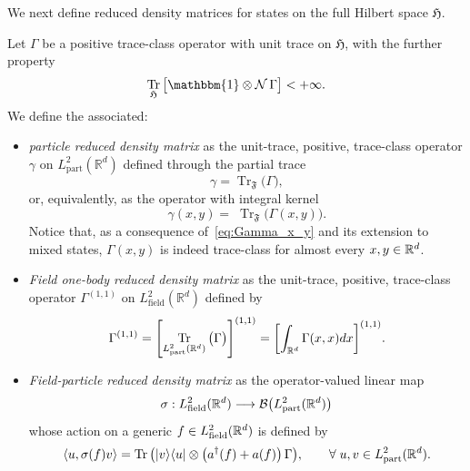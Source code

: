 \documentclass[AHL,Unicode,longabstracts,published]{cedram}
\DeclareMathOperator{\Tr}{Tr}
\DeclareMathOperator{\partt}{part}
\DeclareMathOperator{\field}{field}
\newcommand{\R}{\mathbb{R}}
\newcommand{\cN}{\mathcal{N}}
\newcommand{\gH}{\mathfrak{H}}
\newcommand{\gF}{\mathfrak{F}}
\newcommand{\cB}{\mathcal{B}}
\newcommand{\1}{\mathds{1}}
\let\oldin\in
\renewcommand{\in}{\mathchoice{\oldin}{\oldin}{\,\oldin\,}{\,\oldin\,}}
\renewcommand*{\to}{\mathchoice{\longrightarrow}{\rightarrow}{\rightarrow}{\rightarrow}}
\let\originalleft\left
\let\originalright\right
\renewcommand{\left}{\mathopen{}\mathclose\bgroup\originalleft}
\renewcommand{\right}{\aftergroup\egroup\originalright}
\let\oldforall\forall
\renewcommand*{\forall}{\mathrel{\oldforall}}
\begin{document}
We next define reduced density matrices for states on the full Hilbert space $ \gH$.

\begin{defi}\label{def:reduced_densities}
Let $\Gamma$ be a positive trace-class operator with unit trace on $ \gH$, with the further property
\begin{equation*}
\Tr_{ \gH} \big[\mathbbm{1}\otimes \cN\,\Gamma\big]<+\infty.
\end{equation*}
We define the associated:
\begin{itemize}
\item \emph{particle reduced density matrix} as the unit-trace, positive, trace-class operator $\gamma$ on $L^2_{\partt}(\R^d)$ defined through the partial trace
\begin{equation}
\gamma=\Tr_{\gF}\big(\Gamma\big),
\end{equation}
or, equivalently, as the operator with integral kernel
\begin{equation}
\gamma(x,y)=\;\Tr_{\gF}\big(\Gamma(x,y)\big).
\end{equation}
Notice that, as a consequence of~\eqref{eq:Gamma_x_y} and its extension to mixed states, $\Gamma(x,y)$ is indeed trace-class for almost every $x,y\in\R^d$.
\item \emph{Field one-body reduced density matrix} as the unit-trace, positive, trace-class operator $\Gamma^{(1,1)}$ on $L^2_{\field}(\R^d)$ defined by
\begin{equation}\label{eq:def_rho_field}
\Gamma^{(1,1)}= \left[\Tr_{L^2_{\partt}(\R^d)}\big(\Gamma\big)\right]^{(1,1)}=\left[\int_{\R^d}\Gamma(x,x) dx\right]^{(1,1)}.
\end{equation}
\item \emph{Field-particle reduced density matrix} as the operator-valued linear map
\begin{equation*}
\sigma: L^2_{\field}(\R^d)\to \cB \left(L^2_{\partt}(\R^d)\right)
\end{equation*}
whose action on a generic $f\in L^2_{\field}(\R^d)$ is defined by
\begin{equation}
\left\langle u, \sigma(f) v\right\rangle=\Tr\big(|v\rangle \langle u| \otimes \left(a^\dagger(f) + a (f) \right)\,\Gamma\big),\qquad\forall u,v\in L^2_{\partt}(\R^d).
\end{equation}
\end{itemize}
\end{defi}
\end{document}
